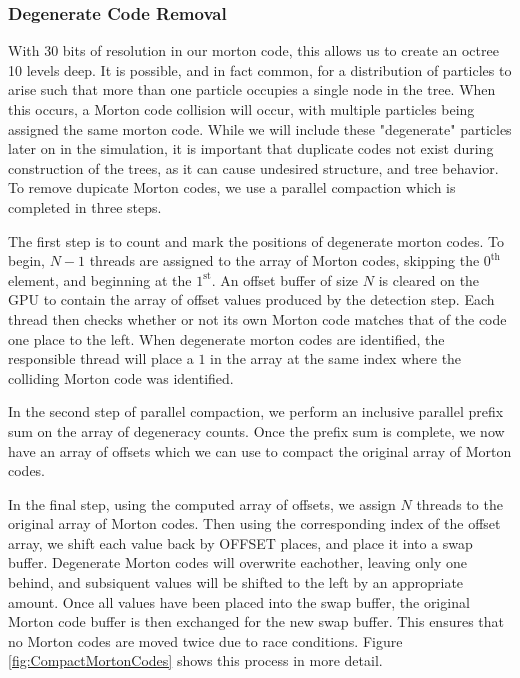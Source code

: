 \documentclass{thesis}
\begin{document}
\subsubsection{Degenerate Code Removal}
With 30 bits of resolution in our morton code, this allows us to create an octree 10 levels deep. It is possible, and in fact common, for a distribution of particles to arise such that more than one particle occupies a single node in the tree. When this occurs, a Morton code collision will occur, with multiple particles being assigned the same morton code. While we will include these "degenerate" particles later on in the simulation, it is important that duplicate codes not exist during construction of the trees, as it can cause undesired structure, and tree behavior. To remove dupicate Morton codes, we use a parallel compaction which is completed in three steps.

The first step is to count and mark the positions of degenerate morton codes. To begin, $N - 1$ threads are assigned to the array of Morton codes, skipping the $\text{0}^\text{th}$ element, and beginning at the $\text{1}^\text{st}$. An offset buffer of size $N$ is cleared on the GPU to contain the array of offset values produced by the detection step. Each thread then checks whether or not its own Morton code matches that of the code one place to the left. When degenerate morton codes are identified, the responsible thread will place a $1$ in the array at the same index where the colliding Morton code was identified.

In the second step of parallel compaction, we perform an inclusive parallel prefix sum on the array of degeneracy counts. Once the prefix sum is complete, we now have an array of offsets which we can use to compact the original array of Morton codes.

In the final step, using the computed array of offsets, we assign $N$ threads to the original array of Morton codes. Then using the corresponding index of the offset array, we shift each value back by OFFSET places, and place it into a swap buffer. Degenerate Morton codes will overwrite eachother, leaving only one behind, and subsiquent values will be shifted to the left by an appropriate amount. Once all values have been placed into the swap buffer, the original Morton code buffer is then exchanged for the new swap buffer. This ensures that no Morton codes are moved twice due to race conditions. Figure \ref{fig:CompactMortonCodes} shows this process in more detail.
\end{document}
